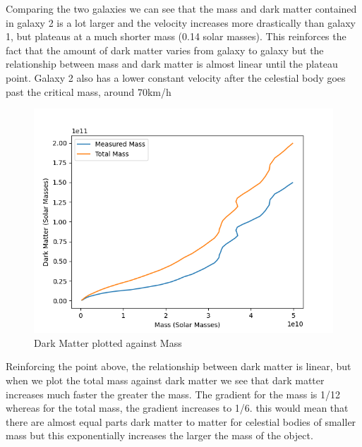 \documentclass[10pt, twocolumn, twoside]{article}
\begin{document}
Comparing the two galaxies we can see that the mass and dark matter contained in galaxy 2 is a lot larger and the velocity increases more drastically than galaxy 1, but plateaus at a much shorter mass (0.14 solar masses). This reinforces the fact that the amount of dark matter varies from galaxy to galaxy but the relationship between mass and dark matter is almost linear until the plateau point. Galaxy 2 also has a lower constant velocity after the celestial body goes past the critical mass, around 70km/h

\newpage

\begin{figure}[ht]
\includegraphics[width=\columnwidth]{graph3.png}
\caption[width=\columnwidth]{Dark Matter plotted against Mass}
\end{figure}

Reinforcing the point above, the relationship between dark matter is linear, but when we plot the total mass against dark matter we see that dark matter increases much faster the greater the mass. The gradient for the mass is 1/12 whereas for the total mass, the gradient increases to 1/6. this would mean that there are almost equal parts dark matter to matter for celestial bodies of smaller mass but this exponentially increases the larger the mass of the object.
\end{document}
